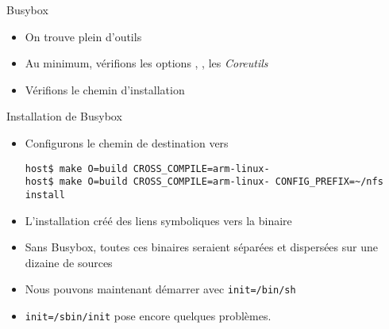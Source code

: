 \begin{frame}[fragile=singleslide]{Busybox}
  \begin{itemize}
  \item On trouve plein d'outils
  \item    Au   minimum,    vérifions les options    ,   ,    les
    \emph{Coreutils}
  \item Vérifions le chemin d'installation
  \end{itemize}
\end{frame}

\begin{frame}[fragile=singleslide]{Installation de Busybox}
  \begin{itemize}
  \item Configurons le chemin de destination vers 
    \begin{lstlisting}
host$ make O=build CROSS_COMPILE=arm-linux-
host$ make O=build CROSS_COMPILE=arm-linux- CONFIG_PREFIX=~/nfs install
    \end{lstlisting}
  \item  L'installation créé  des  liens symboliques  vers la  binaire
  \item  Sans  Busybox,  toutes  ces  binaires  seraient  séparées  et
    dispersées sur une dizaine de sources
  \item Nous pouvons maintenant démarrer avec \verb+init=/bin/sh+
  \item \verb+init=/sbin/init+ pose encore quelques problèmes.
  \end{itemize}
\end{frame}

